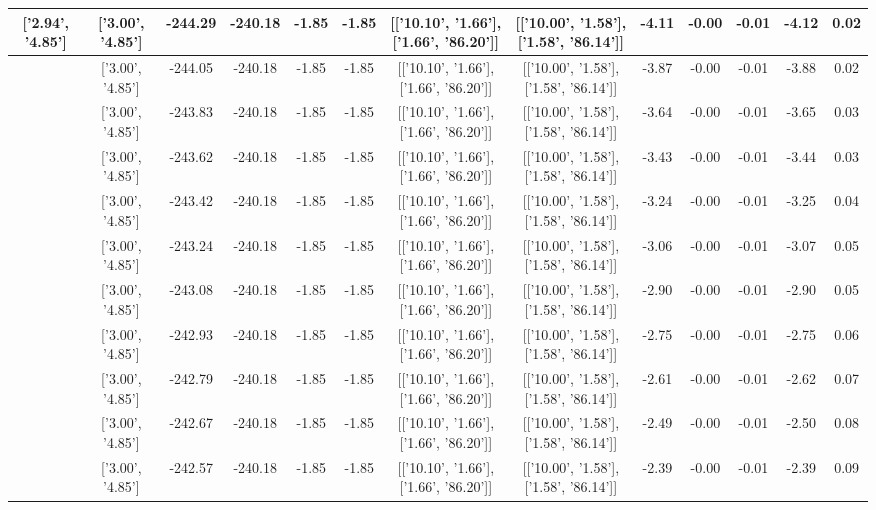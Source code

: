 \begin{table}[htbp]
\begin{adjustbox}{angle=90}
\begin{tabular}{|c|c|c|c|c|c|c|c|c|c|c|c|c|}
 ['2.94', '4.85'] & ['3.00', '4.85'] & -244.29 & -240.18 & -1.85 & -1.85 & [['10.10', '1.66'], ['1.66', '86.20']] & [['10.00', '1.58'], ['1.58', '86.14']] & -4.11 & -0.00 & -0.01 & -4.12 & 0.02\\ \hline
 ['2.94', '4.85'] & ['3.00', '4.85'] & -244.05 & -240.18 & -1.85 & -1.85 & [['10.10', '1.66'], ['1.66', '86.20']] & [['10.00', '1.58'], ['1.58', '86.14']] & -3.87 & -0.00 & -0.01 & -3.88 & 0.02\\ \hline
 ['2.94', '4.85'] & ['3.00', '4.85'] & -243.83 & -240.18 & -1.85 & -1.85 & [['10.10', '1.66'], ['1.66', '86.20']] & [['10.00', '1.58'], ['1.58', '86.14']] & -3.64 & -0.00 & -0.01 & -3.65 & 0.03\\ \hline
 ['2.95', '4.85'] & ['3.00', '4.85'] & -243.62 & -240.18 & -1.85 & -1.85 & [['10.10', '1.66'], ['1.66', '86.20']] & [['10.00', '1.58'], ['1.58', '86.14']] & -3.43 & -0.00 & -0.01 & -3.44 & 0.03\\ \hline
 ['2.95', '4.85'] & ['3.00', '4.85'] & -243.42 & -240.18 & -1.85 & -1.85 & [['10.10', '1.66'], ['1.66', '86.20']] & [['10.00', '1.58'], ['1.58', '86.14']] & -3.24 & -0.00 & -0.01 & -3.25 & 0.04\\ \hline
 ['2.96', '4.85'] & ['3.00', '4.85'] & -243.24 & -240.18 & -1.85 & -1.85 & [['10.10', '1.66'], ['1.66', '86.20']] & [['10.00', '1.58'], ['1.58', '86.14']] & -3.06 & -0.00 & -0.01 & -3.07 & 0.05\\ \hline
 ['2.96', '4.85'] & ['3.00', '4.85'] & -243.08 & -240.18 & -1.85 & -1.85 & [['10.10', '1.66'], ['1.66', '86.20']] & [['10.00', '1.58'], ['1.58', '86.14']] & -2.90 & -0.00 & -0.01 & -2.90 & 0.05\\ \hline
 ['2.96', '4.85'] & ['3.00', '4.85'] & -242.93 & -240.18 & -1.85 & -1.85 & [['10.10', '1.66'], ['1.66', '86.20']] & [['10.00', '1.58'], ['1.58', '86.14']] & -2.75 & -0.00 & -0.01 & -2.75 & 0.06\\ \hline
 ['2.97', '4.85'] & ['3.00', '4.85'] & -242.79 & -240.18 & -1.85 & -1.85 & [['10.10', '1.66'], ['1.66', '86.20']] & [['10.00', '1.58'], ['1.58', '86.14']] & -2.61 & -0.00 & -0.01 & -2.62 & 0.07\\ \hline
 ['2.97', '4.85'] & ['3.00', '4.85'] & -242.67 & -240.18 & -1.85 & -1.85 & [['10.10', '1.66'], ['1.66', '86.20']] & [['10.00', '1.58'], ['1.58', '86.14']] & -2.49 & -0.00 & -0.01 & -2.50 & 0.08\\ \hline
 ['2.97', '4.85'] & ['3.00', '4.85'] & -242.57 & -240.18 & -1.85 & -1.85 & [['10.10', '1.66'], ['1.66', '86.20']] & [['10.00', '1.58'], ['1.58', '86.14']] & -2.39 & -0.00 & -0.01 & -2.39 & 0.09\\ \hline

\end{tabular}
\end{adjustbox}
\end{table}
